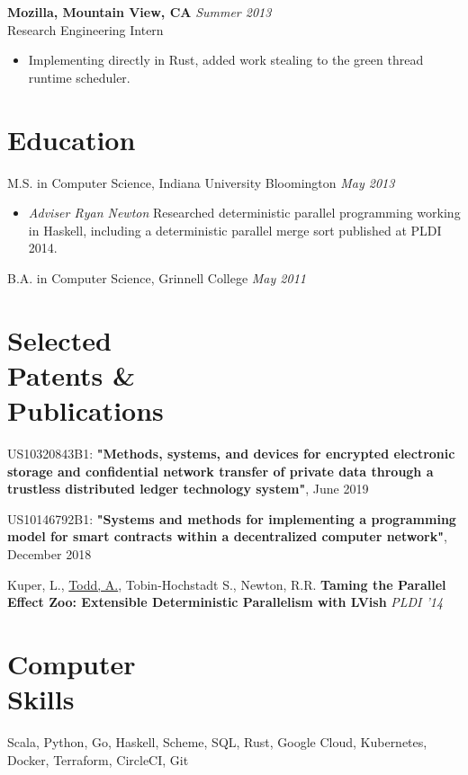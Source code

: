 \documentclass[margin]{res}
\begin{document}
\begin{resume}
 {\bf Mozilla, Mountain View, CA} \hfill \textit{Summer 2013} \\
 Research Engineering Intern
 \begin{itemize} \itemsep -2pt  %
 \item Implementing directly in Rust, added work stealing to the green thread runtime scheduler.
 \end{itemize}
 
\section{Education}

M.S. in Computer Science, Indiana University Bloomington \hfill \textit{May 2013}
 \begin{itemize} \itemsep -2pt
 \item {\it Adviser Ryan Newton} Researched deterministic parallel programming working in Haskell, including a deterministic parallel merge sort published at PLDI 2014.
 \end{itemize}
  B.A. in Computer Science, Grinnell College \hfill \textit{May 2011}
 
\section{Selected \\ Patents \& \\ Publications}

US10320843B1: {\bf "Methods, systems, and devices for encrypted electronic storage and confidential network transfer of private data through a trustless distributed ledger technology system"}, June 2019

US10146792B1: {\bf "Systems and methods for implementing a programming model for smart contracts within a decentralized computer network"}, December 2018

Kuper, L., \underline{Todd, A.}, Tobin-Hochstadt S., Newton, R.R. {\bf Taming the Parallel Effect Zoo: Extensible Deterministic Parallelism with LVish} \textit{PLDI '14} 

\section{Computer \\ Skills}
Scala, Python, Go, Haskell, Scheme, SQL, Rust, Google Cloud, Kubernetes, Docker, Terraform, CircleCI, Git
\end{resume} 
\end{document}
